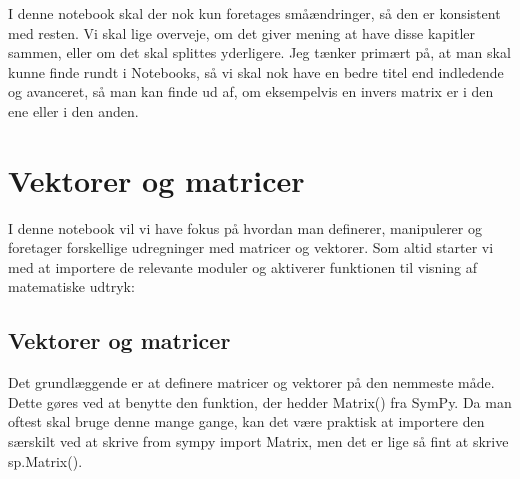 \documentclass[letterpaper,10pt,english]{jupyterBook}
\begin{document}
I denne notebook skal der nok kun foretages småændringer, så den er konsistent med resten. Vi skal lige overveje, om det giver mening at have disse kapitler sammen, eller om det skal splittes yderligere. Jeg tænker primært på, at man skal kunne finde rundt i Notebooks, så vi skal nok have en bedre titel end indledende og avanceret, så man kan finde ud af, om eksempelvis en invers matrix er i den ene eller i den anden.


\section{Vektorer og matricer}
\label{\detokenize{notebooks/sympy/Notebook_LinAlg1:vektorer-og-matricer}}\label{\detokenize{notebooks/sympy/Notebook_LinAlg1::doc}}
I denne notebook vil vi have fokus på hvordan man definerer, manipulerer og foretager forskellige udregninger med matricer og vektorer. Som altid starter vi med at importere de relevante moduler og aktiverer funktionen til visning af matematiske udtryk:

\begin{sphinxVerbatim}[commandchars=\\\{\}]
                       
                
                    
      
\end{sphinxVerbatim}


\subsection{Vektorer og matricer}
\label{\detokenize{notebooks/sympy/Notebook_LinAlg1:id1}}
Det grundlæggende er at definere matricer og vektorer på den nemmeste måde. Dette gøres ved at benytte den funktion, der hedder Matrix() fra SymPy. Da man oftest skal bruge denne mange gange, kan det være praktisk at importere den særskilt ved at skrive from sympy import Matrix, men det er lige så fint at skrive sp.Matrix().
\end{document}
